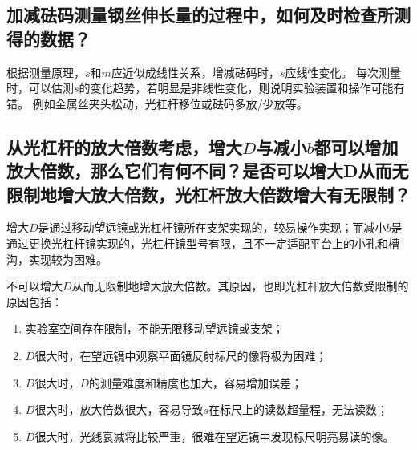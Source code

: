 \documentclass[]{../../templates/Report}%
\begin{document}
\begin{fullreportonly}
\subsection{加减砝码测量钢丝伸长量的过程中，如何及时检查所测得的数据？}

根据测量原理，$s$和$m$应近似成线性关系，增减砝码时，$s$应线性变化。
每次测量时，可以估测$s$的变化趋势，若明显是非线性变化，则说明实验装置和操作可能有错。
例如金属丝夹头松动，光杠杆移位或砝码多放/少放等。

\subsection{从光杠杆的放大倍数考虑，增大$D$与减小$b$都可以增加放大倍数，那么它们有何不同？是否可以增大D从而无限制地增大放大倍数，光杠杆放大倍数增大有无限制？}
增大$D$是通过移动望远镜或光杠杆镜所在支架实现的，较易操作实现；而减小$b$是通过更换光杠杆镜实现的，光杠杆镜型号有限，且不一定适配平台上的小孔和槽沟，实现较为困难。

不可以增大$D$从而无限制地增大放大倍数。其原因，也即光杠杆放大倍数受限制的原因包括：
\begin{enumerate}
    \item 实验室空间存在限制，不能无限移动望远镜或支架；
    \item $D$很大时，在望远镜中观察平面镜反射标尺的像将极为困难；
    \item $D$很大时，$D$的测量难度和精度也加大，容易增加误差；
    \item $D$很大时，放大倍数很大，容易导致$s$在标尺上的读数超量程，无法读数；
    \item $D$很大时，光线衰减将比较严重，很难在望远镜中发现标尺明亮易读的像。
\end{enumerate}

\end{fullreportonly}
\insertnotes
\end{document}
